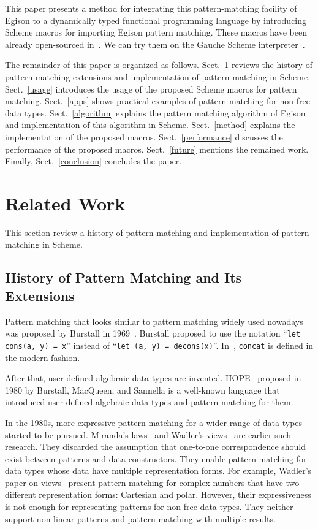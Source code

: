 \documentclass[acmlarge]{acmart}
\begin{document}
This paper presents a method for integrating this pattern-matching facility of Egison to a dynamically typed functional programming language by introducing Scheme macros for importing Egison pattern matching.
These macros have been already open-sourced in~\cite{egisonScheme}.
We can try them on the Gauche Scheme interpreter~\cite{gaucheWeb}.

The remainder of this paper is organized as follows.
Sect.~\ref{history} reviews the history of pattern-matching extensions and implementation of pattern matching in Scheme.
Sect.~\ref{usage} introduces the usage of the proposed Scheme macros for pattern matching.
Sect.~\ref{apps} shows practical examples of pattern matching for non-free data types.
Sect.~\ref{algorithm} explains the pattern matching algorithm of Egison and implementation of this algorithm in Scheme.
Sect.~\ref{method} explains the implementation of the proposed macros.
Sect.~\ref{performance} discusses the performance of the proposed macros.
Sect.~\ref{future} mentions the remained work.
Finally, Sect.~\ref{conclusion} concludes the paper.

\section{Related Work}\label{history}

This section review a history of pattern matching and implementation of pattern matching in Scheme.

\subsection{History of Pattern Matching and Its Extensions}\label{history1}

Pattern matching that looks similar to pattern matching widely used nowadays was proposed by Burstall in 1969~\cite{burstall1969proving}.
Burstall proposed to use the notation ``\texttt{let cons(a, y) = x}'' instead of ``\texttt{let (a, y) = decons(x)}''.
In~\cite{burstall1969proving}, \texttt{concat} is defined in the modern fashion.

After that, user-defined algebraic data types are invented.
HOPE~\cite{burstall1980hope} proposed in 1980 by Burstall, MacQueen, and Sannella is a well-known language that introduced user-defined algebraic data types and pattern matching for them.

In the 1980s, more expressive pattern matching for a wider range of data types started to be pursued.
Miranda's laws~\cite{thompson1986laws,thompson1990lawful} and Wadler's views~\cite{wadler1987views} are earlier such research.
They discarded the assumption that one-to-one correspondence should exist between patterns and data constructors.
They enable pattern matching for data types whose data have multiple representation forms.
For example, Wadler's paper on views~\cite{wadler1987views} present pattern matching for complex numbers that have two different representation forms: Cartesian and polar.
However, their expressiveness is not enough for representing patterns for non-free data types.
They neither support non-linear patterns and pattern matching with multiple results.
\end{document}

